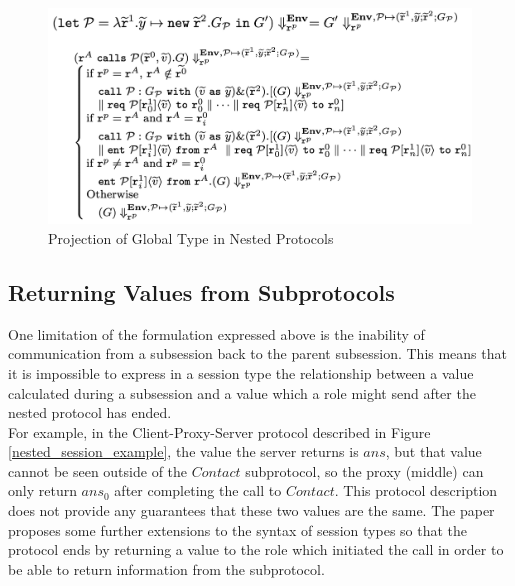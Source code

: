 \documentclass[12pt,twoside]{report}
\begin{document}
\begin{figure}[h]
    \centering
    \includegraphics[scale=0.45]{nested_session_projection.png}
    \caption{Projection of Global Type in Nested Protocols\cite{nestedprotocols}}
    \label{nested_session_projection}
\end{figure}{}

\subsection{Returning Values from Subprotocols}\label{nested-protocols-return-value}
One limitation of the formulation expressed above is the inability of communication from a subsession back to the parent subsession. This means that it is impossible to express in a session type the relationship between a value calculated during a subsession and a value which a role might send after the nested protocol has ended. \\

For example, in the Client-Proxy-Server protocol described in Figure \ref{nested_session_example}, the value the server returns is $\mathit{ans}$, but that value cannot be seen outside of the $\mathit{Contact}$ subprotocol, so the proxy (middle) can only return $\mathit{ans_0}$ after completing the call to $\mathit{Contact}$. This protocol description does not provide any guarantees that these two values are the same. The paper proposes some further extensions to the syntax of session types so that the protocol ends by returning a value to the role which initiated the call in order to be able to return information from the subprotocol. \\
\end{document}
